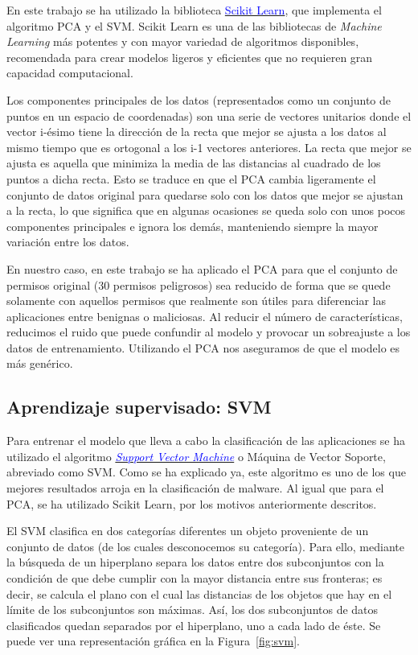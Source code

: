 En este trabajo se ha utilizado la biblioteca \href{https://scikit-learn.org/stable/}{\textcolor{blue}{Scikit Learn}}, que implementa el algoritmo PCA y el SVM. Scikit Learn es una de las bibliotecas de \textit{Machine Learning} más potentes y con mayor variedad de algoritmos disponibles, recomendada para crear modelos ligeros y eficientes que no requieren gran capacidad computacional\hypersetup{citecolor=red}\cite{oreilly}.

Los componentes principales de los datos (representados como un conjunto de puntos en un espacio de coordenadas) son una serie de vectores unitarios donde el vector i-ésimo tiene la dirección de la recta que mejor se ajusta a los datos al mismo tiempo que es ortogonal a los i-1 vectores anteriores. La recta que mejor se ajusta es aquella que minimiza la media de las distancias al cuadrado de los puntos a dicha recta. Esto se traduce en que el PCA cambia ligeramente el conjunto de datos original para quedarse solo con los datos que mejor se ajustan a la recta, lo que significa que en algunas ocasiones se queda solo con unos pocos componentes principales e ignora los demás, manteniendo siempre la mayor variación entre los datos.

En nuestro caso, en este trabajo se ha aplicado el PCA para que el conjunto de permisos original (30 permisos peligrosos) sea reducido de forma que se quede solamente con aquellos permisos que realmente son útiles para diferenciar las aplicaciones entre benignas o maliciosas. Al reducir el número de características, reducimos el ruido que puede confundir al modelo y provocar un sobreajuste a los datos de entrenamiento. Utilizando el PCA nos aseguramos de que el modelo es más genérico.

\subsection{Aprendizaje supervisado: SVM}

Para entrenar el modelo que lleva a cabo la clasificación de las aplicaciones se ha utilizado el algoritmo \textit{\href{https://en.wikipedia.org/wiki/Support-vector_machine}{\textcolor{blue}{Support Vector Machine}}} o Máquina de Vector Soporte, abreviado como SVM. Como se ha explicado ya, este algoritmo es uno de los que mejores resultados arroja en la clasificación de malware. Al igual que para el PCA, se ha utilizado Scikit Learn, por los motivos anteriormente descritos.

El SVM clasifica en dos categorías diferentes un objeto proveniente de un conjunto de datos (de los cuales desconocemos su categoría). Para ello, mediante la búsqueda de un hiperplano separa los datos entre dos subconjuntos con la condición de que debe cumplir con la mayor distancia entre sus fronteras; es decir, se calcula el plano con el cual las distancias de los objetos que hay en el límite de los subconjuntos son máximas. Así, los dos subconjuntos de datos clasificados quedan separados por el hiperplano, uno a cada lado de éste. Se puede ver una representación gráfica en la Figura~\ref{fig:svm}.

